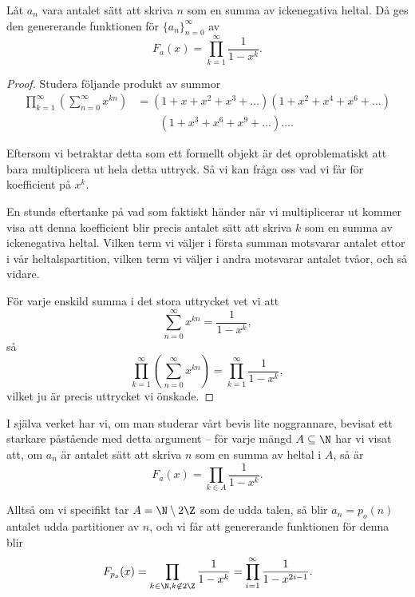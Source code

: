 \documentclass[nobib]{tufte-handout}
\begin{document}
\begin{lemma}\label{lem:gen_func_integer_partitions}
    Låt $a_n$ vara antalet sätt att skriva $n$ som en summa av ickenegativa heltal. Då ges den genererande funktionen för $\{a_n\}_{n=0}^\infty$ av
    $$F_a(x) = \prod_{k=1}^{\infty} \frac{1}{1 - x^k}.$$
\end{lemma}
\begin{proof}
    Studera följande produkt av summor
    \begin{align*}
        \prod_{k=1}^{\infty}\left(\sum_{n=0}^{\infty} x^{kn}\right) &= \left(1 + x + x^2 + x^3 + \ldots\right)\left(1 + x^2 + x^4 + x^6 + \ldots\right)\\
        &\qquad\left(1 + x^3 + x^6 + x^9 + \ldots\right)\ldots.
    \end{align*}

    Eftersom vi betraktar detta som ett formellt objekt är det oproblematiskt att bara multiplicera ut hela detta uttryck. Så vi kan fråga oss vad vi får för koefficient på $x^k$.

    En stunds eftertanke på vad som faktiskt händer när vi multiplicerar ut kommer visa att denna koefficient blir precis antalet sätt att skriva $k$ som en summa av ickenegativa heltal. Vilken term vi väljer i första summan motsvarar antalet ettor i vår heltalspartition, vilken term vi väljer i andra motsvarar antalet tvåor, och så vidare.

    För varje enskild summa i det stora uttrycket vet vi att
    $$\sum_{n=0}^\infty x^{kn} = \frac{1}{1-x^k},$$
    så
    $$\prod_{k=1}^{\infty}\left(\sum_{n=0}^{\infty} x^{kn}\right) = \prod_{k=1}^{\infty} \frac{1}{1 - x^k},$$
    vilket ju är precis uttrycket vi önskade.
\end{proof}

\begin{remark}
    I själva verket har vi, om man studerar vårt bevis lite noggrannare, bevisat ett starkare påstående med detta argument -- för varje mängd $A \subseteq \N$ har vi visat att, om $a_n$ är antalet sätt att skriva $n$ som en summa av heltal i $A$, så är
    $$F_a(x) = \prod_{k \in A} \frac{1}{1 - x^k}.$$

    Alltså om vi specifikt tar $A = \N\setminus2\Z$ som de udda talen, så blir $a_n = p_o(n)$ antalet udda partitioner av $n$, och vi får att genererande funktionen för denna blir
    $$F_{p_o}(x) = \prod_{k \in \N, k \not\in 2\Z} \frac{1}{1-x^k} = \prod_{i=1}^{\infty} \frac{1}{1 - x^{2i-1}}.$$
\end{remark}
\end{document}
